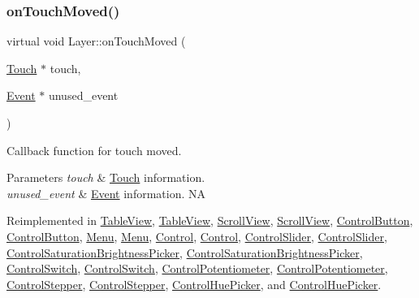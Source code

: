 \subsubsection{\texorpdfstring{on\+Touch\+Moved()}{onTouchMoved()}\hspace{0.1cm}{\footnotesize\ttfamily [2/2]}}
{\footnotesize\ttfamily virtual void Layer\+::on\+Touch\+Moved (\begin{DoxyParamCaption}\item[{\hyperlink{classTouch}{Touch} $\ast$}]{touch,  }\item[{\hyperlink{classEvent}{Event} $\ast$}]{unused\+\_\+event }\end{DoxyParamCaption})\hspace{0.3cm}{\ttfamily [virtual]}}

Callback function for touch moved.


\begin{DoxyParams}{Parameters}
{\em touch} & \hyperlink{classTouch}{Touch} information. \\
\hline
{\em unused\+\_\+event} & \hyperlink{classEvent}{Event} information.  NA \\
\hline
\end{DoxyParams}


Reimplemented in \hyperlink{classTableView_acd131e5fa29332743e625a1a0d047965}{Table\+View}, \hyperlink{classTableView_a242e9d8c695681b41eef636471e768b5}{Table\+View}, \hyperlink{classScrollView_a8a0b3a876f644fbd941773e577c7b550}{Scroll\+View}, \hyperlink{classScrollView_a0958fd1a06430212b3d3cbe26ce2bb9c}{Scroll\+View}, \hyperlink{classControlButton_a8c8a5c24adf67ec671fbc113889f0870}{Control\+Button}, \hyperlink{classControlButton_aacecc916b91af98f4f9a2550d678bd44}{Control\+Button}, \hyperlink{classMenu_a0d8965a2a3df64d987e2bc91f77a43fd}{Menu}, \hyperlink{classMenu_ad69115ad80e86bbe904d575253afc781}{Menu}, \hyperlink{classControl_a98c8b1c7d2a15318ca720b5a398fbb14}{Control}, \hyperlink{classControl_a26d2e6af053319dc605949678f726622}{Control}, \hyperlink{classControlSlider_ad7aab266125d50d61a0a58c00f44f94d}{Control\+Slider}, \hyperlink{classControlSlider_adc06e1f4b54e0f72c9359c111b6913ff}{Control\+Slider}, \hyperlink{classControlSaturationBrightnessPicker_a1330b4d2fca4a1a312b1594e6ee6b99c}{Control\+Saturation\+Brightness\+Picker}, \hyperlink{classControlSaturationBrightnessPicker_aea0bada57d1f6e2bb3f456e77e342979}{Control\+Saturation\+Brightness\+Picker}, \hyperlink{classControlSwitch_a74c30d86ef910e4ee32a413153e74042}{Control\+Switch}, \hyperlink{classControlSwitch_a74e7f363deee0b399be486f668dad631}{Control\+Switch}, \hyperlink{classControlPotentiometer_a5da1557dea949b31c82c56ed7aef23eb}{Control\+Potentiometer}, \hyperlink{classControlPotentiometer_aedfddc1d724a15c31897a50eaf1b93e6}{Control\+Potentiometer}, \hyperlink{classControlStepper_ae79c66bc7b2a2f44fbfe2fa3a5782ee9}{Control\+Stepper}, \hyperlink{classControlStepper_a83a981cc66f6e1669b079b83842d6b79}{Control\+Stepper}, \hyperlink{classControlHuePicker_ae287e5f1cd8856c76475825549f098d8}{Control\+Hue\+Picker}, and \hyperlink{classControlHuePicker_a09874584a6a21355d830546ee3b0751d}{Control\+Hue\+Picker}.

